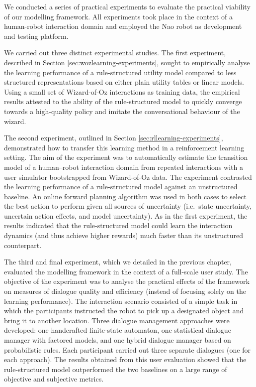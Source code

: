 We conducted a series of practical experiments to evaluate the practical viability of our modelling framework. All experiments took place in the context of a human-robot interaction domain and employed the Nao robot as development and testing platform. 

We carried out three distinct experimental studies.  The first experiment, described in Section \ref{sec:wozlearning-experiments}, sought to empirically analyse the learning performance of a rule-structured utility model compared to less structured representations based on either plain utility tables or linear models.  Using a small set of Wizard-of-Oz interactions as training data, the empirical results attested to the ability of the rule-structured model to quickly converge towards a high-quality policy and imitate the conversational behaviour of the wizard.

The second experiment, outlined in Section \ref{sec:rllearning-experiments}, demonstrated how to transfer this learning method in a reinforcement learning setting.  The aim of the experiment was to automatically estimate the transition model of a human--robot interaction domain from repeated interactions with a user simulator bootstrapped from Wizard-of-Oz data. The experiment contrasted the learning performance of a rule-structured model against an unstructured baseline.  An online forward planning algorithm was used in both cases to select the best action to perform given all sources of uncertainty (i.e.\ state uncertainty, uncertain action effects, and model uncertainty). As in the first experiment, the results indicated that the rule-structured model could learn the interaction dynamics (and thus achieve higher rewards) much faster than its unstructured counterpart.

The third and final experiment, which we detailed in the previous chapter, evaluated the modelling framework in the context of a full-scale user study.   The objective of the experiment was to analyse the practical effects of the framework on measures of dialogue quality and efficiency (instead of focusing solely on the learning performance). The interaction scenario consisted of a simple task in which the participants instructed the robot to pick up a designated object and bring it to another location. Three dialogue management approaches were developed: one handcrafted finite-state automaton, one statistical dialogue manager with factored models, and one hybrid dialogue manager based on probabilistic rules.  Each participant carried out three separate dialogues (one for each approach).  The results obtained from this user evaluation showed that the rule-structured model outperformed the two baselines on a large range of objective and subjective metrics.

